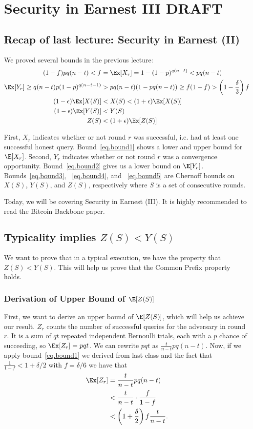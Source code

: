 \chapter{Security in Earnest III \small{\textsf{DRAFT}}}\label{chapter.earnest3}

\section{Recap of last lecture: Security in Earnest (II)}
We proved several bounds in the previous lecture:
\begin{align}
(1-f)pq(n-t) < f &= \Ex[X_r] = 1 - (1-p)^{q(n-t)} < pq(n-t)\label{eq.bound1}\\
\Ex[Y_r] \geq q(n-t)p(1-p)^{q(n-t-1)} &> pq(n-t)(1-pq(n-t)) \geq f(1-f) > \left(1-\frac{\delta}{3}\right)f \label{eq.bound2}\\
(1-\epsilon)\Ex[X(S)] &< X(S) < (1+\epsilon)\Ex[X(S)]\label{eq.bound3}\\
 (1-\epsilon)\Ex[Y(S)] &< Y(S)\label{eq.bound4}\\
Z(S) &< (1+\epsilon)\Ex[Z(S)]\label{eq.bound5}
\end{align}

 First, $X_r$ indicates whether or not round $r$ was successful, i.e. had at least one successful honest query. Bound~\ref{eq.bound1} shows a lower and upper bound for $\E[X_r]$.
 Second, $Y_r$ indicates whether or not round $r$ was a convergence opportunity. Bound~\ref{eq.bound2} gives us a lower bound on $\E[Y_r]$. Bounds~\ref{eq.bound3}, ~\ref{eq.bound4}, and ~\ref{eq.bound5} are Chernoff bounds on $X(S)$, $Y(S)$, and $Z(S)$, respectively where $S$ is a set of consecutive rounds.

 Today, we will be covering Security in Earnest (III). It is highly recommended to read the Bitcoin Backbone paper.

\section{Typicality implies $Z(S) < Y(S)$}
We want to prove that in a typical execution, we have the property that $Z(S) < Y(S)$. This will help us prove that the Common Prefix property holds.

\subsection{Derivation of Upper Bound of $\E[Z(S)]$}
First, we want to derive an upper bound of $\E[Z(S)]$, which will help us achieve our result.
$Z_r$ counts the number of successful queries for the adversary in round $r$. It is a sum of $qt$ repeated independent Bernoulli trials, each with a $p$ chance of succeeding, so $\Ex[Z_r] = pqt$. We can rewrite $pqt$ as $\frac{t}{n-t} pq(n-t)$. Now, if we apply bound~\ref{eq.bound1} we derived from last class and the fact that $\frac{1}{1-f} < 1 + \delta/2$ with $f = \delta/6$ we have that
\begin{align}\Ex[Z_r] &= \frac{t}{n-t} pq(n-t) \\
&< \frac{t}{n-t} \cdot \frac{f}{1-f}\\
&< \left(1 + \frac{\delta}{2}\right)f \frac{t}{n-t}.\label{eq.zexpupper}
\end{align}

